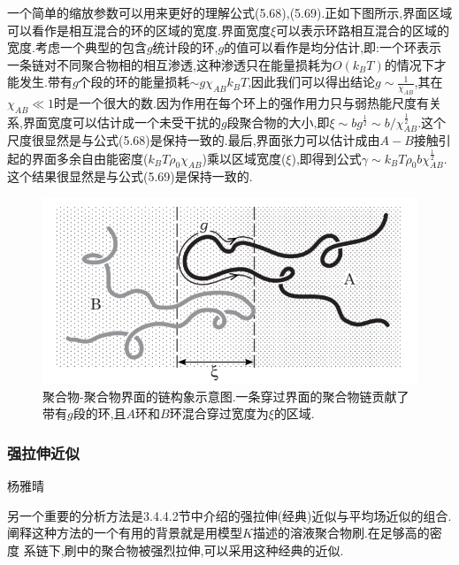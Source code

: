 一个简单的缩放参数可以用来更好的理解公式(5.68),(5.69).正如下图所示,界面区域可以看作是相互混合的环的区域的宽度.界面宽度$\xi$可以表示环路相互混合的区域的宽度.考虑一个典型的包含$g$统计段的环,$g$的值可以看作是均分估计,即:一个环表示一条链对不同聚合物相的相互渗透,这种渗透只在能量损耗为$O(k_B T)$的情况下才能发生.带有$g$个段的环的能量损耗$\sim g\chi_{AB}k_BT$,因此我们可以得出结论$g\sim \frac{1}{\chi_{AB}}$,其在$\chi_{AB} \ll1$时是一个很大的数.因为作用在每个环上的强作用力只与弱热能尺度有关系,界面宽度可以估计成一个未受干扰的$g$段聚合物的大小,即$\xi \sim bg^{\frac{1}{2}}\sim b/{\chi_{AB}^{\frac{1}{2}}}$.这个尺度很显然是与公式(5.68)是保持一致的.最后,界面张力可以估计成由$A−B$接触引起的界面多余自由能密度($k_B T\rho_0\chi_{AB}$)乘以区域宽度($\xi$),即得到公式$\gamma\sim k_B T\rho_0b\chi_{AB}^{\frac{1}{2}}$.这个结果很显然是与公式(5.69)是保持一致的.
\begin{figure}[H]
	\centering
	\includegraphics[width=12cm]{./figures/fig5-5.png}
	\caption{聚合物-聚合物界面的链构象示意图.一条穿过界面的聚合物链贡献了带有$g$段的环,且$A$环和$B$环混合穿过宽度为$\xi$的区域.}
\end{figure}

\subsubsection{强拉伸近似}
\begin{center}
	杨雅晴
\end{center}

另一个重要的分析方法是3.4.4.2节中介绍的强拉伸(经典)近似与平均场近似的组合.阐释这种方法的一个有用的背景就是用模型$K$描述的溶液聚合物刷.在足够高的密度
系链下,刷中的聚合物被强烈拉伸,可以采用这种经典的近似.

